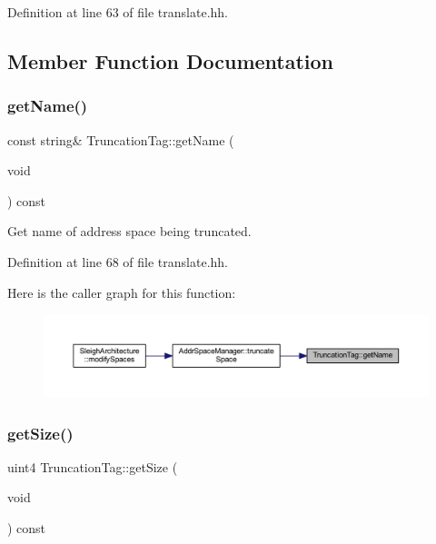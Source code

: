 Definition at line 63 of file translate.\+hh.



\subsection{Member Function Documentation}
\mbox{\label{class_truncation_tag_ae4a23e369a872d5aebe8a595530b65a4}} 
\subsubsection{\texorpdfstring{getName()}{getName()}}
{\footnotesize\ttfamily const string\& Truncation\+Tag\+::get\+Name (\begin{DoxyParamCaption}\item[{void}]{ }\end{DoxyParamCaption}) const\hspace{0.3cm}{\ttfamily [inline]}}



Get name of address space being truncated. 



Definition at line 68 of file translate.\+hh.

Here is the caller graph for this function\+:
\nopagebreak
\begin{figure}[H]
\begin{center}
\leavevmode
\includegraphics[width=350pt]{class_truncation_tag_ae4a23e369a872d5aebe8a595530b65a4_icgraph}
\end{center}
\end{figure}
\mbox{\label{class_truncation_tag_a648828324c96d4844ac5f161e3c7e466}} 
\subsubsection{\texorpdfstring{getSize()}{getSize()}}
{\footnotesize\ttfamily uint4 Truncation\+Tag\+::get\+Size (\begin{DoxyParamCaption}\item[{void}]{ }\end{DoxyParamCaption}) const\hspace{0.3cm}{\ttfamily [inline]}}



